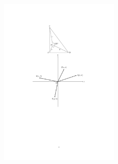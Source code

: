 \documentclass[a4paper,12pt,uplatex]{jsarticle}  %
\begin{document}
\begin{enumerate}
\begin{figure}[ht]
  \centering
  \includegraphics[width=6.0cm]{jizen_3_2_solution.pdf}
\end{figure}


\end{enumerate}

\bigskip

\end{document}
